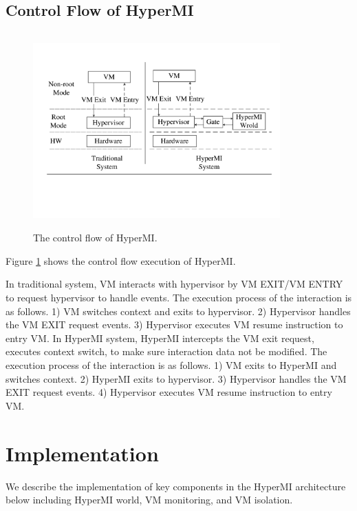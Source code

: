 \documentclass[conference]{IEEEtran}
\begin{document}
\subsection{Control Flow of HyperMI}
\begin{figure}
\centerline{\includegraphics[width=9.5cm, height=7.5cm]{pdfvmcsProcess.pdf}}
\caption{The control flow of HyperMI. } \label{fig+1}
\end{figure}
Figure \ref{fig+1} shows the control flow execution of HyperMI. 

In traditional system, VM interacts with hypervisor by VM EXIT/VM ENTRY to request hypervisor to handle events. The execution process of the interaction is as follows. 1) VM switches context and exits to hypervisor. 2) Hypervisor handles the VM EXIT request events. 3) Hypervisor executes VM resume instruction to entry VM.
In HyperMI system, HyperMI intercepts the VM exit request, executes context switch, to make sure interaction data not
be modified. The execution process of the interaction is as follows. 1) VM exits to HyperMI and switches context. 2) HyperMI exits to hypervisor. 3) Hypervisor handles the VM EXIT request events. 4) Hypervisor executes VM resume instruction to entry VM.
\section{Implementation}
We describe the implementation of key components in the HyperMI architecture below including HyperMI world, VM monitoring, and VM isolation.
\end{document}
